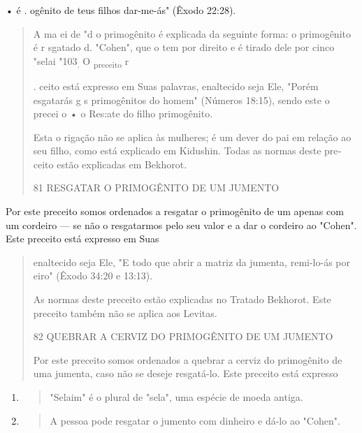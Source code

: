 • é . ogênito de teus filhos dar-me-ás" (Êxodo 22:28).

\begin{quote}
A ma ei de "d o primogênito é explicada da seguinte forma: o primogênito
é r sgatado d. "Cohen", que o tem por direito e é tirado dele por cinco
"selai "103\textsubscript{.} O \textsubscript{preceito} r

. ceito está expresso em Suas palavras, enaltecido seja Ele, "Porém
esgatarás g s primogênitos do homem" (Números 18:15), sen­do este o
precei o • o Res:ate do filho primogênito.

Esta o rigação não se aplica às mulheres; é um dever do pai em rela­ção
ao seu filho, como está explicado em Kidushin. Todas as normas deste
pre­ceito estão explicadas em Bekhorot.

81 RESGATAR O PRIMOGÊNITO DE UM JUMENTO
\end{quote}

Por este preceito somos ordenados a resgatar o primogênito de um apenas
com um cordeiro --- se não o resgatarmos pelo seu valor e a dar o
cordeiro ao "Cohen". Este preceito está expresso em Suas

\begin{quote}
enaltecido seja Ele, "E todo que abrir a matriz da jumenta, remi-lo-ás
por eiro" (Êxodo 34:20 e 13:13).

As normas deste preceito estão explicadas no Tratado Bekhorot. Es­te
preceito também não se aplica aos Levitas.

82 QUEBRAR A CERVIZ DO PRIMOGÊNITO DE UM JUMENTO

Por este preceito somos ordenados a quebrar a cerviz do primogê­nito de
uma jumenta, caso não se deseje resgatá-lo. Este preceito está expresso
\end{quote}

\begin{enumerate}
\def\labelenumi{\arabic{enumi}.}
\setcounter{enumi}{102}
\item
  \begin{quote}
  "Selaim" é o plural de "sela", uma espécie de moeda antiga.
  \end{quote}
\item
  \begin{quote}
  A pessoa pode resgatar o jumento com dinheiro e dá-lo ao "Cohen".
  \end{quote}
\end{enumerate}

